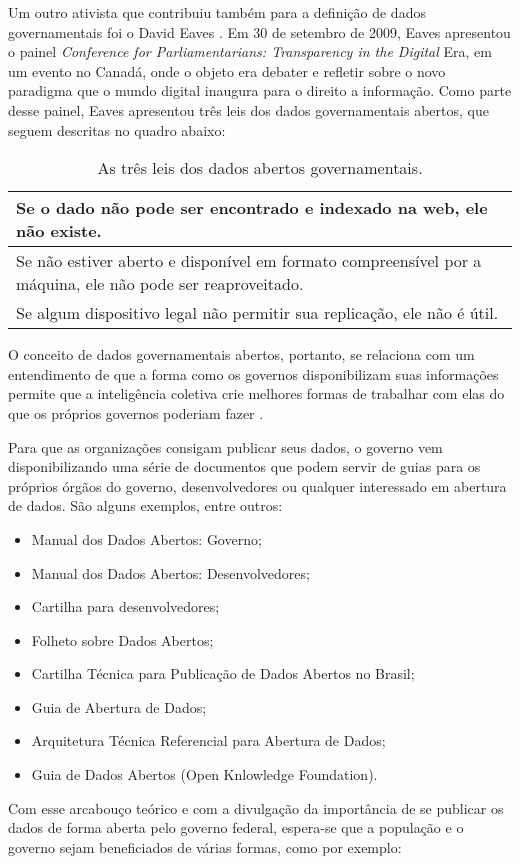 Um outro ativista que contribuiu também para a definição de dados governamentais foi o David Eaves \cite{3leis}. Em 30 de setembro de 2009, Eaves apresentou o painel \textit{Conference for Parliamentarians: Transparency in the Digital} Era, em um evento no Canadá, onde o objeto era debater e refletir sobre o novo paradigma que o mundo digital inaugura para o direito a informação. Como parte desse painel, Eaves apresentou três leis dos dados governamentais abertos, que seguem descritas no quadro abaixo:
\begin{table}[H]
\begin{center}
    \begin{tabular}{ | p{10cm} | }
    \hline
   Se o dado não pode ser encontrado e indexado na web, ele não existe.\\ \hline
   Se não estiver aberto e disponível em formato compreensível por a máquina, ele não pode ser reaproveitado.\\ \hline
   Se algum dispositivo legal não permitir sua replicação, ele não é útil.\\ \hline
    \end{tabular}
    \caption{As três leis dos dados abertos governamentais.}
    \label{tab-leis-lehman}
\end{center}
\end{table}
O conceito de dados governamentais abertos, portanto, se relaciona com um entendimento de que a forma como os governos disponibilizam suas informações permite que a inteligência coletiva crie melhores formas de trabalhar com elas do que os próprios governos poderiam fazer \cite{silva}.

Para que as organizações consigam publicar seus dados, o governo vem disponibilizando uma série de documentos que podem servir de guias para os próprios órgãos do governo, desenvolvedores ou qualquer interessado em abertura de dados. São alguns exemplos, entre outros:

\begin{itemize}
\item Manual dos Dados Abertos: Governo;
\item Manual dos Dados Abertos: Desenvolvedores;
\item Cartilha para desenvolvedores;
\item Folheto sobre Dados Abertos;
\item Cartilha Técnica para Publicação de Dados Abertos no Brasil;
\item Guia de Abertura de Dados;
\item Arquitetura Técnica Referencial para Abertura de Dados;
\item Guia de Dados Abertos (Open Knlowledge Foundation).

\end{itemize}
Com esse arcabouço teórico e com a divulgação da importância de se publicar os dados de forma aberta pelo governo federal, espera-se que a população e o governo sejam beneficiados de várias formas, como por exemplo:


